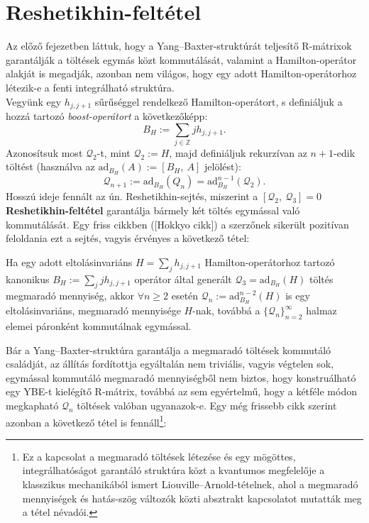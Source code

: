 \documentclass[12pt,a4paper,oneside]{report}
\newcommand{\Q}{\mathcal{Q}}
\newcommand{\adbh}{\mathrm{ad}_{B_H}}
\newcommand{\Z}{\mathbb{Z}}
\begin{document}
\section{Reshetikhin-feltétel}
Az előző fejezetben láttuk, hogy a Yang--Baxter-struktúrát teljesítő R-mátrixok garantálják a töltések egymás közt kommutálását, valamint a Hamilton-operátor alakját is megadják, azonban nem világos, hogy egy adott Hamilton-operátorhoz létezik-e a fenti integrálható struktúra.\\
Vegyünk egy $h_{j,j+1}$ sűrűséggel rendelkező Hamilton-operátort, s definiáljuk a hozzá tartozó \textit{boost-operátort} a következőképp:
\begin{equation}\label{eq:boost}
    B_H:=\sum_{j\in\Z}jh_{j,j+1}.
\end{equation}
Azonosítsuk most $\Q_2$-t, mint $\Q_2:=H$, majd definiáljuk rekurzívan az $n+1$-edik töltést (használva az $\mathrm{ad}_{B_H}(A):=[B_H,\ A]$ jelölést):
\begin{equation}
    \Q_{n+1}:=\adbh(Q_n)=\adbh^{n-1}(\Q_2).
\end{equation}
Hosszú ideje fennált az ún. Reshetikhin-sejtés, miszerint a $[\Q_2,\ \Q_3]=0$ \textbf{Reshetikhin-feltétel} garantálja bármely két töltés egymással való kommutálását. Egy friss cikkben ([Hokkyo cikk]) a szerzőnek sikerült pozitívan feloldania ezt a sejtés, vagyis érvényes a következő tétel:
\begin{tetel}\label{the:Reshetikhin}
    Ha egy adott eltolásinvariáns $H=\sum_j h_{j,j+1}$ Hamilton-operátorhoz tartozó kanonikus $B_H:=\sum_j jh_{j,j+1}$ operátor által generált $\Q_3=\adbh(H)$ töltés megmaradó mennyiség, akkor $\forall n\ge 2$ esetén $\Q_n:=\adbh^{n-2}(H)$ is egy eltolásinvariáns, megmaradó mennyisége $H$-nak, továbbá a $\{\Q_n\}_{n=2}^\infty$ halmaz elemei páronként kommutálnak egymással.
\end{tetel}
Bár a Yang--Baxter-struktúra garantálja a megmaradó töltések kommutáló családját, az állítás fordítottja egyáltalán nem triviális, vagyis végtelen sok, egymással kommutáló megmaradó mennyiségből nem biztos, hogy konstruálható egy YBE-t kielégítő R-mátrix, továbbá az sem egyértelmű, hogy a kétféle módon megkapható $\Q_n$ töltések valóban ugyanazok-e. Egy még frissebb cikk szerint azonban a következő tétel is fennáll\footnote{Ez a kapcsolat a megmaradó töltések létezése és egy mögöttes, integrálhatóságot garantáló struktúra közt a kvantumos megfelelője a klasszikus mechanikából ismert Liouville--Arnold-tételnek, ahol a megmaradó mennyiségek és hatás-szög változók közti absztrakt kapcsolatot mutatták meg a tétel névadói.}:
\end{document}
